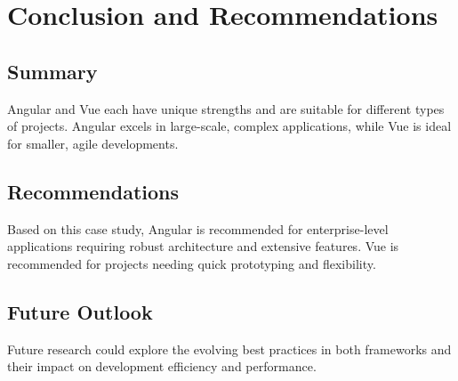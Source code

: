 \chapter{Conclusion and Recommendations}%

\section{Summary}
Angular and Vue each have unique strengths and are suitable for different types of projects. Angular excels in large-scale, complex applications, while Vue is ideal for smaller, agile developments.
\section{Recommendations}
Based on this case study, Angular is recommended for enterprise-level applications requiring robust architecture and extensive features. Vue is recommended for projects needing quick prototyping and flexibility.
\section{Future Outlook}
Future research could explore the evolving best practices in both frameworks and their impact on development efficiency and performance.

